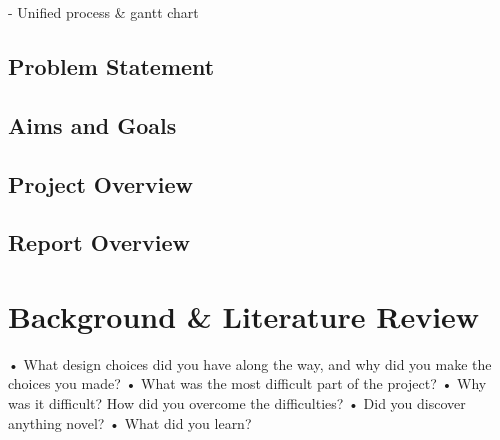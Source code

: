 \documentclass{report}
\begin{document}
- Unified process & gantt chart 

\section{Problem Statement}



\section{Aims and Goals}

\section{Project Overview}

\section{Report Overview}






\chapter{Background \& Literature Review}
• What design choices did you have along the way, and why did you
make the choices you made?
• What was the most difficult part of the project?
• Why was it difficult? How did you overcome the difficulties?
• Did you discover anything novel?
• What did you learn?
\end{document}
